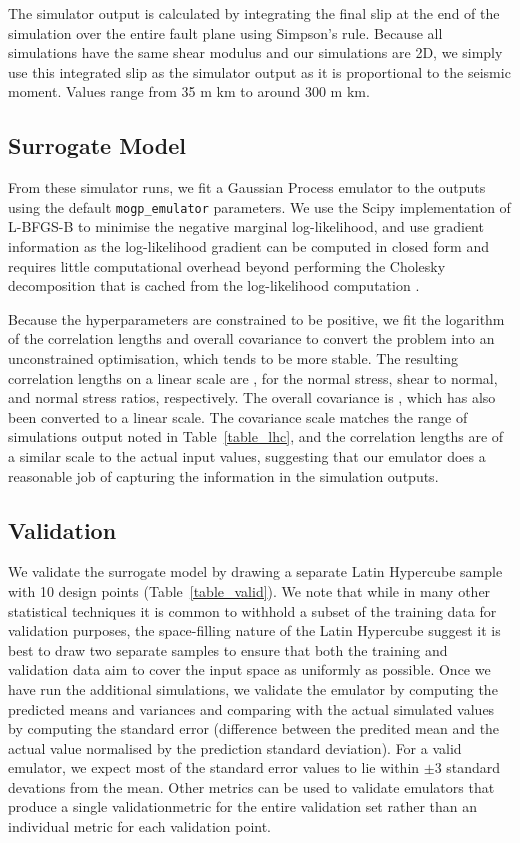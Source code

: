 \documentclass[openacc]{rstransa}%
\begin{document}
The simulator output is calculated by integrating the final slip at the end of the simulation over the
entire fault plane using Simpson's rule. Because all simulations have the same shear modulus and our
simulations are 2D, we simply use this integrated slip as the simulator output as it is proportional
to the seismic moment. Values range from 35 m km to around 300 m km.

\subsection{Surrogate Model}

From these simulator runs, we fit a Gaussian Process emulator to the outputs using the default
\texttt{mogp\_emulator} parameters. We use the Scipy implementation of L-BFGS-B \cite{lbfgs} to minimise the
negative marginal log-likelihood, and use gradient information as the log-likelihood gradient
can be computed in closed form and requires little computational overhead beyond performing the
Cholesky decomposition that is cached from the log-likelihood computation \cite{gprw}.

Because the hyperparameters are constrained to be positive, we fit the logarithm of the correlation
lengths and overall covariance to convert the problem into an unconstrained optimisation, which tends
to be more stable. The resulting correlation lengths on a linear scale are \unskip,
for the normal stress, shear to normal, and normal stress ratios, respectively.
The overall covariance is \unskip, which has also been converted to a linear scale.
The covariance scale matches the range of simulations
output noted in Table~\ref{table_lhc}, and the correlation lengths are of a similar scale to the actual
input values, suggesting that our emulator does a reasonable job of capturing the information in
the simulation outputs.

\subsection{Validation}

We validate the surrogate model by drawing a separate Latin Hypercube sample
with 10 design points (Table~\ref{table_valid}).
We note that while in many other statistical
techniques it is common to withhold a subset of the training data for
validation purposes, the space-filling nature of the Latin Hypercube suggest
it is best to draw two separate samples to ensure that both the training
and validation data aim to cover the input space as uniformly as possible.
Once we have run the additional simulations, we validate the emulator by
computing the predicted means and variances and comparing with the
actual simulated values by computing the standard error (difference
between the predited mean and the actual value normalised by the prediction
standard deviation). For a valid emulator, we expect most of the standard
error values to lie within $\pm 3$ standard devations from the mean.
Other metrics can be used to validate emulators \cite{validation} that
produce a single validationmetric for the entire validation set rather than an
individual metric for each validation point.
\end{document}
